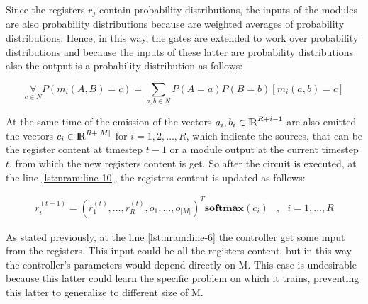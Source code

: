 Since the registers $r_j$ contain probability distributions, the inputs of the modules are also probability distributions because are weighted averages of probability distributions. Hence, in this way, the gates are extended to work over probability distributions and because the inputs of these latter are probability distributions also the output is a probability distribution as follows:
\begin{center}
	\begin{equation}
		\mathop{\forall}\limits_{c \in N} P(m_i(A, B) = c) = \sum\limits_{a,b \in N} P(A = a)P(B = b)[m_i(a, b) = c]
	\end{equation}
\end{center}

At the same time of the emission of the vectors $a_{i}, b_{i} \in \textrm{I\!R}^{R+i-1}$ are also emitted the vectors $c_i \in \textrm{I\!R}^{R+|M|}$ for $i = 1, 2, \dots, R$, which indicate the sources, that can be the register content at timestep $t-1$ or a module output at the current timestep $t$, from which the new registers content is get. So after the circuit is executed, at the line \ref{lst:nram:line-10}, the registers content is updated as follows:
\begin{center}
	\begin{equation}
		\begin{split}
			r_i^{(t + 1)} = (r_1^{(t)}, \dots, r_R^{(t)}, o_1, \dots, o_{|M|})^T\textbf{softmax}(c_i) &,\ \ \ i = 1,\dots,R
		\end{split}
	\end{equation}
\end{center}

As stated previously, at the line \ref{lst:nram:line-6} the controller get some input from the registers. This input could be all the registers content, but in this way the controller's parameters would depend directly on M. This case is undesirable because this latter could learn the specific problem on which it trains, preventing this latter to generalize to different size of M. 

